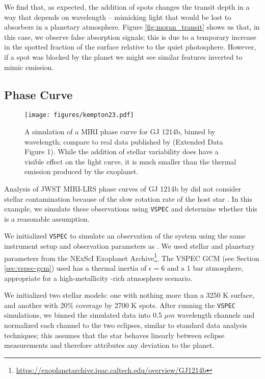 \documentclass[linenumbers,5p,twocolumn,authoryear]{elsarticle}
\newcommand{\vspec}[1]{\texttt{VSPEC}#1}
\begin{document}
We find that, as expected, the addition of spots changes the transit depth in a way that depends on wavelength -- mimicking light that would be lost to absorbers in a planetary atmosphere. Figure \ref{fig:moran_transit} shows us that, in this case, we observe false absorption signals; this is due to a temporary increase in the spotted fraction of the surface relative to the quiet photosphere. However, if a spot was blocked by the planet we might see similar features inverted to mimic emission.

\subsection{Phase Curve}
\begin{figure}[!htbp]
    \centering
    \texttt{[image: figures/kempton23.pdf]}
    \caption{
        A simulation of a MIRI phase curve for GJ 1214b, binned by wavelength; compare to real data published by \citet{kempton2023}(Extended Data Figure 1). While the addition of stellar variability does have a visible effect on the light curve, it is much smaller than the thermal emission produced by the exoplanet.
        }
    \label{fig:gj1214b}
\end{figure}

Analysis of JWST MIRI-LRS phase curves of GJ 1214b by \citet{kempton2023} did not consider stellar contamination because of the slow rotation rate of the host star \citep[approximately 1/80$^{\text{th}}$ the orbital frequency,][]{cloutier2021}. In this example, we simulate these observations using \vspec{} and determine whether this is a reasonable assumption.

We initialized \vspec{} to simulate an observation of the system using the same instrument setup and observation parameters as \citet{kempton2023}. We used stellar and planetary parameters from the NExScI Exoplanet Archive\footnote{\url{https://exoplanetarchive.ipac.caltech.edu/overview/GJ1214b}}. The VSPEC GCM (see Section \ref{sec:vspec-gcm}) used has a thermal inertia of $\epsilon = 6$ and a 1 bar  atmosphere, appropriate for a high-metallicity -rich atmosphere scenario.

We initialized two stellar models: one with nothing more than a 3250 K surface, and another with 20\% coverage by 2700 K spots. After running the \vspec{} simulations, we binned the simulated data into 0.5 $\mu m$ wavelength channels and normalized each channel to the two eclipses, similar to standard data analysis techniques; this assumes that the star behaves linearly between eclipse measurements and therefore attributes any deviation to the planet.
\end{document}
